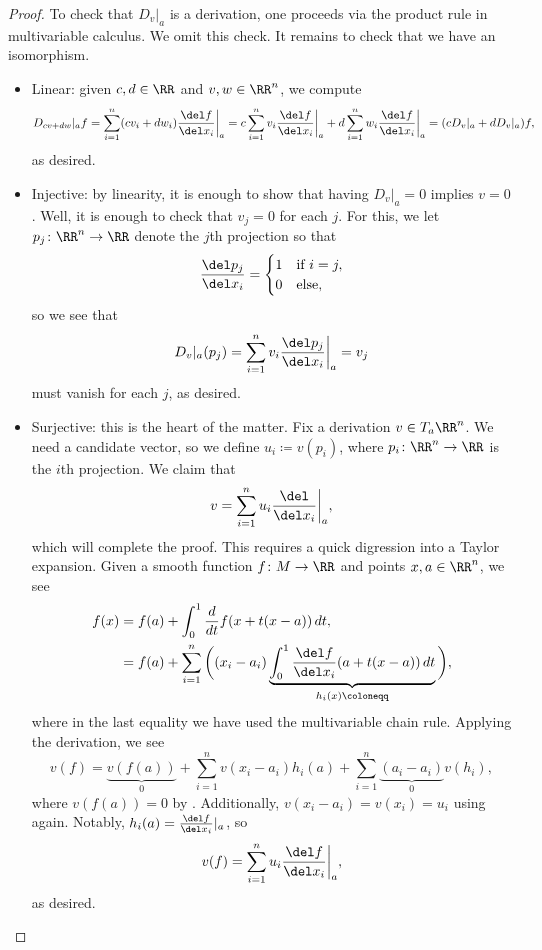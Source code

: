 \documentclass[../notes.tex]{subfiles}
\begin{document}
\begin{proof}
	To check that $D_v|_a$ is a derivation, one proceeds via the product rule in multivariable calculus. We omit this check. It remains to check that we have an isomorphism.
	\begin{itemize}
		\item Linear: given $c,d\in\RR$ and $v,w\in\RR^n$, we compute
		\[D_{cv+dw}|_af=\sum_{i=1}^n(cv_i+dw_i)\frac{\del f}{\del x_i}\bigg|_a=c\sum_{i=1}^nv_i\frac{\del f}{\del x_i}\bigg|_a+d\sum_{i=1}^nw_i\frac{\del f}{\del x_i}\bigg|_a=(cD_v|_a+dD_v|_a)f,\]
		as desired.
		\item Injective: by linearity, it is enough to show that having $D_v|_a=0$ implies $v=0$. Well, it is enough to check that $v_j=0$ for each $j$. For this, we let $p_j\colon\RR^n\to\RR$ denote the $j$th projection so that
		\[\frac{\del p_j}{\del x_i}=\begin{cases}
			1 & \text{if }i=j, \\
			0 & \text{else},
		\end{cases}\]
		so we see that
		\[D_v|_a(p_j)=\sum_{i=1}^nv_i\frac{\del p_j}{\del x_i}\bigg|_a=v_j\]
		must vanish for each $j$, as desired.
		\item Surjective: this is the heart of the matter. Fix a derivation $v\in T_a\RR^n$. We need a candidate vector, so we define $u_i\coloneqq v(p_i)$, where $p_i\colon\RR^n\to\RR$ is the $i$th projection. We claim that
		\[v=\sum_{i=1}^nu_i\frac{\del}{\del x_i}\bigg|_a,\]
		which will complete the proof. This requires a quick digression into a Taylor expansion. Given a smooth function $f\colon M\to\RR$ and points $x,a\in\RR^n$, we see
		\begin{align*}
			f(x) &= f(a)+\int_0^1\frac d{dt}f(x+t(x-a))\,dt, \\
			&= f(a)+\sum_{i=1}^n\bigg((x_i-a_i)\underbrace{\int_0^1\frac{\del f}{\del x_i}(a+t(x-a))\,dt}_{h_i(x)\coloneqq}\bigg),
		\end{align*}
		where in the last equality we have used the multivariable chain rule. Applying the derivation, we see
		\[v(f) = \underbrace{v(f(a))}_0+\sum_{i=1}^nv(x_i-a_i)h_i(a)+\sum_{i=1}^n\underbrace{(a_i-a_i)}_0v(h_i),\]
		where $v(f(a))=0$ by . Additionally, $v(x_i-a_i)=v(x_i)=u_i$ using  again. Notably, $h_i(a)=\frac{\del f}{\del x_i}|_a$, so
		\[v(f)=\sum_{i=1}^nu_i\frac{\del f}{\del x_i}\bigg|_a,\]
		as desired.
		\qedhere
	\end{itemize}
\end{proof}
\end{document}
